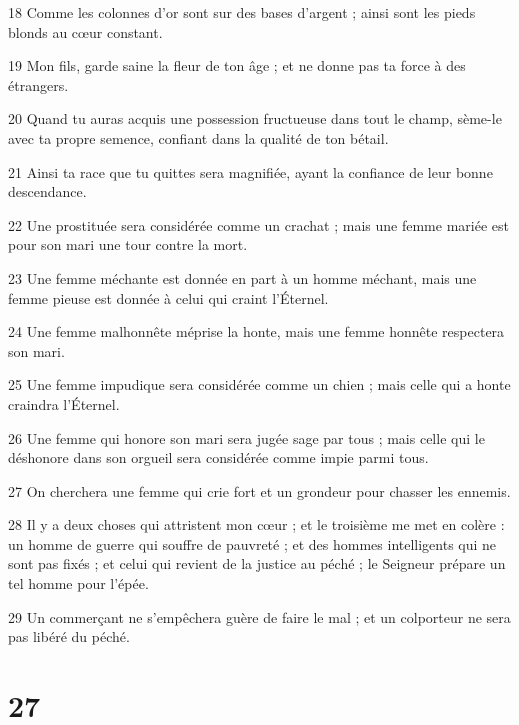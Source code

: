 \par 18 Comme les colonnes d'or sont sur des bases d'argent ; ainsi sont les pieds blonds au cœur constant.
\par 19 Mon fils, garde saine la fleur de ton âge ; et ne donne pas ta force à des étrangers.
\par 20 Quand tu auras acquis une possession fructueuse dans tout le champ, sème-le avec ta propre semence, confiant dans la qualité de ton bétail.
\par 21 Ainsi ta race que tu quittes sera magnifiée, ayant la confiance de leur bonne descendance.
\par 22 Une prostituée sera considérée comme un crachat ; mais une femme mariée est pour son mari une tour contre la mort.
\par 23 Une femme méchante est donnée en part à un homme méchant, mais une femme pieuse est donnée à celui qui craint l'Éternel.
\par 24 Une femme malhonnête méprise la honte, mais une femme honnête respectera son mari.
\par 25 Une femme impudique sera considérée comme un chien ; mais celle qui a honte craindra l'Éternel.
\par 26 Une femme qui honore son mari sera jugée sage par tous ; mais celle qui le déshonore dans son orgueil sera considérée comme impie parmi tous.
\par 27 On cherchera une femme qui crie fort et un grondeur pour chasser les ennemis.
\par 28 Il y a deux choses qui attristent mon cœur ; et le troisième me met en colère : un homme de guerre qui souffre de pauvreté ; et des hommes intelligents qui ne sont pas fixés ; et celui qui revient de la justice au péché ; le Seigneur prépare un tel homme pour l'épée.
\par 29 Un commerçant ne s'empêchera guère de faire le mal ; et un colporteur ne sera pas libéré du péché.

\chapter{27}

